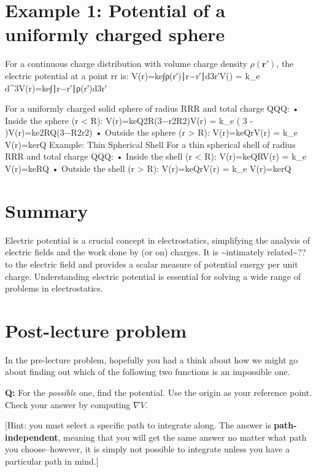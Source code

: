 \documentclass[
  letterpaper,
  DIV=11,
  numbers=noendperiod]{scrreprt}
\begin{document}
\section{Example 1: Potential of a uniformly charged
sphere}\label{example-1-potential-of-a-uniformly-charged-sphere}

For a continuous charge distribution with volume charge density
\(\rho(\mathrm{\mathbf{r}}')\), the electric potential at a point
rr is: V(r)=ke∫ρ(r′)∣r−r′∣d3r′V() = k\_e
\int {}
d\^{}3V(r)=ke∫∣r−r′∣ρ(r′)d3r′

For a uniformly charged solid sphere of radius RRR and total charge QQQ:
• Inside the sphere (r \textless{} R): V(r)=keQ2R(3−r2R2)V(r) = k\_e
 \left( 3 -  \right)V(r)=ke2RQ(3−R2r2) •
Outside the sphere (r \textgreater{} R): V(r)=keQrV(r) = k\_e
V(r)=kerQ Example: Thin Spherical Shell For a thin spherical
shell of radius RRR and total charge QQQ: • Inside the shell (r
\textless{} R): V(r)=keQRV(r) = k\_e V(r)=keRQ • Outside the
shell (r \textgreater{} R): V(r)=keQrV(r) = k\_e V(r)=kerQ

\section{Summary}\label{summary-1}

Electric potential is a crucial concept in electrostatics, simplifying
the analysis of electric fields and the work done by (or on) charges. It
is \textasciitilde intimately related\textasciitilde?? to the electric
field and provides a scalar measure of potential energy per unit charge.
Understanding electric potential is essential for solving a wide range
of problems in electrostatics.

\section{Post-lecture problem}\label{post-lecture-problem-1}

In the pre-lecture problem, hopefully you had a think about how we might
go about finding out which of the following two functions is an
impossible one.

\textbf{Q:} For the \emph{possible} one, find the potential. Use the
origin as your reference point. Check your answer by computing
\(\nabla V\).

{[}Hint: you must select a specific path to integrate along. The answer
is \textbf{path-independent}, meaning that you will get the same answer
no matter what path you choose--however, it is simply not possible to
integrate unless you have a particular path in mind.{]}
\end{document}
